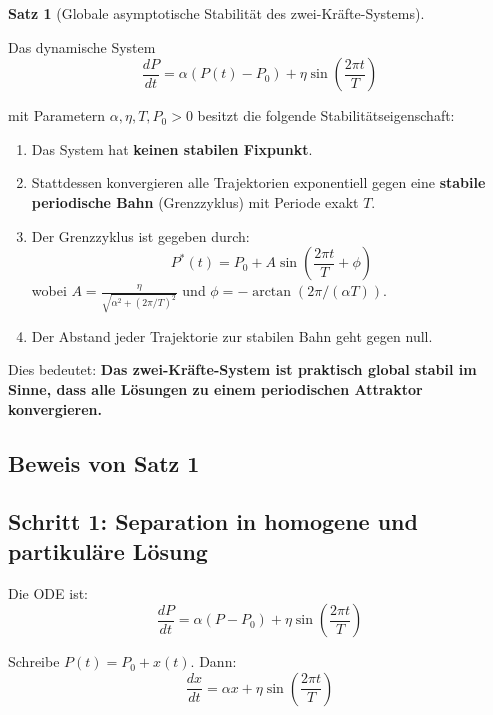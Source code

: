 \documentclass[a4paper, 12pt, twoside, openright]{report}
\theoremstyle{definition}
\theoremstyle{definition}
\newtheorem{satz}{Satz}[chapter]
\begin{document}
\begin{satz}[Globale asymptotische Stabilität des zwei-Kräfte-Systems]\label{satz:stabilitaet}
    
    Das dynamische System
    \begin{equation}
        \frac{dP}{dt} = \alpha(P(t) - P_0) + \eta \sin\left(\frac{2\pi t}{T}\right)
    \end{equation}
    
    mit Parametern $\alpha, \eta, T, P_0 > 0$ besitzt die folgende Stabilitätseigenschaft:
    
    \begin{enumerate}
        \item Das System hat \textbf{keinen stabilen Fixpunkt}.
        \item Stattdessen konvergieren alle Trajektorien exponentiell gegen eine \textbf{stabile periodische Bahn} (Grenzzyklus) mit Periode exakt $T$.
        \item Der Grenzzyklus ist gegeben durch:
        \begin{equation}
            P^*(t) = P_0 + A \sin\left(\frac{2\pi t}{T} + \phi\right)
        \end{equation}
        wobei $A = \frac{\eta}{\sqrt{\alpha^2 + (2\pi/T)^2}}$ und $\phi = -\arctan(2\pi / (\alpha T))$.
        \item Der Abstand jeder Trajektorie zur stabilen Bahn geht gegen null.
    \end{enumerate}
    
    Dies bedeutet: \textbf{Das zwei-Kräfte-System ist praktisch global stabil im Sinne, dass alle Lösungen zu einem periodischen Attraktor konvergieren.}
\end{satz}

\subsection{Beweis von Satz 1}

\subsection{Schritt 1: Separation in homogene und partikuläre Lösung}

Die ODE ist:
\begin{equation}
    \frac{dP}{dt} = \alpha(P - P_0) + \eta \sin\left(\frac{2\pi t}{T}\right)
\end{equation}

Schreibe $P(t) = P_0 + x(t)$. Dann:
\begin{equation}
    \frac{dx}{dt} = \alpha x + \eta \sin\left(\frac{2\pi t}{T}\right)
\end{equation}
\end{document}
